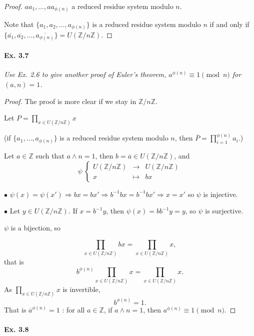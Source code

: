 \documentclass[11pt,a4paper]{article}
\newcommand{\Z}{\mathbb{Z}}
\begin{document}
{\begin{proof}
$aa_1, \ldots, aa_{\phi(n)}$ a reduced residue system modulo $n$.

\medskip

Note that $\{a_1,a_2,\ldots, a_{\phi(n)}\}$ is a reduced residue system modulo $n$  if and only if $\{\overline{a_1},\overline{a_2},\ldots,\overline{a_{\phi(n)}}\} = U(\Z/n\Z)$.
\end{proof}

\paragraph{Ex. 3.7}

{\it Use Ex. 2.6 to give another proof of Euler's theorem, $a^{\phi(n)} \equiv 1 \pmod n$ for $(a, n) = 1$.
}

\begin{proof}
The proof is more clear if we stay in $\Z/n\Z$.

Let $P = \prod\limits_{x \in U(\Z/n\Z)} x$

(if $\{a_1,\ldots,a_{\phi(n)}\}$ is a reduced residue system modulo $n$, then $\overline{P} = \prod\limits_{i=1}^{\phi(n)} a_{i}$.)

Let $a \in \Z$ such that $a \wedge n = 1$, then $b = \overline{a} \in U(\Z/n\Z)$, and
$$
\psi \ 
\left\{
\begin{array}{ccc}
 U(\Z/n\Z) &  \to  &   U(\Z/n\Z)  \\
  x &\mapsto   &bx   
\end{array}
\right.
$$

$\bullet$ $\psi(x) = \psi(x') \Rightarrow bx = bx' \Rightarrow b^{-1} b x = b^{-1} b x' \Rightarrow x = x'$ so $\psi$ is injective.

$\bullet$ Let $y \in U(\Z/n\Z)$. If $x = b^{-1}y$, then $\psi(x) = b b^{-1} y = y$, so $\psi$ is surjective.

$\psi$ is a bijection, so

$$\prod_{x \in U(\Z/n\Z) } bx = \prod_{x \in U(\Z/n\Z) } x,$$
that is
$$b^{\phi(n)} \prod_{x \in U(\Z/n\Z) } x = \prod_{x \in U(\Z/n\Z) } x.$$
As $\prod\limits_{x \in U(\Z/n\Z) } x$ is invertible, 
$$b^{\phi(n)} = 1.$$
That is $\overline{a}^{\phi(n)} = 1$ : for all $a\in \Z$, if $a\wedge n = 1$, then $a^{\phi(n)} \equiv 1 \pmod n$. 
\end{proof}

\paragraph{Ex. 3.8}

}
\end{document}
